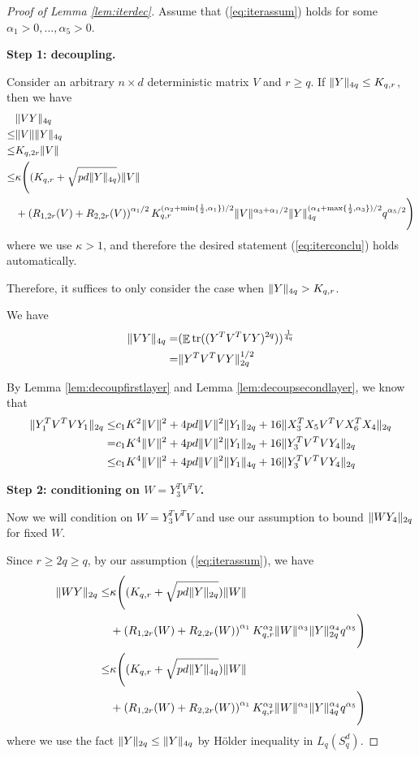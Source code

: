 \documentclass[10pt,a4paper]{amsart}
\DeclareMathOperator*{\tr}{tr}
\DeclareMathOperator{\E}{\mathbb{E}}
\DeclarePairedDelimiter{\norm}{\lVert}{\rVert}
\begin{document}
\begin{proof}[Proof of Lemma \ref{lem:iterdec}]


Assume that (\ref{eq:iterassum}) holds for some $\alpha_1>0,...,\alpha_5>0$.

\textbf{Step 1: decoupling.}


Consider an arbitrary $n \times d$ deterministic matrix $V$ and $r \ge q$. If $\norm{Y}_{4q} \le K_{q,r}$, then we have
\begin{align*}
    &\norm{VY}_{4q} \\\le& 
    \norm{V}\norm{Y}_{4q}
    \\ \le & K_{q,2r}\norm{V}
    \\ \le &\kappa \Bigg((K_{q,r}+\sqrt{pd\norm{Y}_{4q}})\norm{V} \\&+ \left(R_{1,2r}(V)+R_{2,2r}(V)\right)^{\alpha_1/2}K_{q,r}^{(\alpha_2+\min\{\frac{1}{2},\alpha_1\})/2}\norm{V}^{\alpha_3+\alpha_1/2} \norm{Y}_{4q}^{(\alpha_4+\max\{\frac{1}{2},\alpha_3\})/2}q^{\alpha_5/2}\Bigg)
\end{align*}
where we use $\kappa>1$, and therefore the desired statement (\ref{eq:iterconclu}) holds automatically.

Therefore, it suffices to only consider the case when $\norm{Y}_{4q} > K_{q,r}$.


We have
\begin{align*}
    \norm{VY}_{4q}=&(\E\tr((Y^TV^TVY)^{2q}))^{\frac{1}{4q}}
\\=&\norm{Y^TV^TVY}_{2q}^{1/2}
\end{align*}

By Lemma \ref{lem:decoupfirstlayer} and Lemma \ref{lem:decoupsecondlayer}, we know that
\begin{align*}
    \norm{Y_1^TV^TVY_1}_{2q} \le& c_1 K^2 \norm{V}^2 + 4pd\norm{V}^2 \norm{Y_1}_{2q} + 16 \norm{X_3^TX_5V^TVX_6^TX_4}_{2q}
    \\=& c_1 K^4 \norm{V}^2 + 4pd\norm{V}^2 \norm{Y_1}_{2q}+ 16 \norm{Y_3^TV^TVY_4}_{2q}
    \\ \le & c_1 K^4 \norm{V}^2 + 4pd\norm{V}^2 \norm{Y_1}_{4q}+ 16 \norm{Y_3^TV^TVY_4}_{2q}
\end{align*}



\textbf{Step 2: conditioning on $W=Y_3^TV^TV$.}

Now we will condition on $W=Y_3^TV^TV$ and use our assumption to bound $\norm{WY_4}_{2q}$ for fixed $W$.

Since $r \ge 2q \ge q$, by our assumption (\ref{eq:iterassum}), we have
    \begin{align*}
    \norm{WY}_{2q} \le & \kappa \Bigg((K_{q,r}+\sqrt{pd\norm{Y}_{2q}})\norm{W} \\&+ \left(R_{1,2r}(W)+R_{2,2r}(W)\right)^{\alpha_1}K_{q,r}^{\alpha_2}\norm{W}^{\alpha_3} \norm{Y}_{2q} ^{\alpha_4}q^{\alpha_5}\Bigg)
    \\\le & \kappa \Bigg((K_{q,r}+\sqrt{pd\norm{Y}_{4q}})\norm{W} \\&+ \left(R_{1,2r}(W)+R_{2,2r}(W)\right)^{\alpha_1}K_{q,r}^{\alpha_2}\norm{W}^{\alpha_3} \norm{Y}_{4q} ^{\alpha_4}q^{\alpha_5}\Bigg)
\end{align*}
where we use the fact $\norm{Y}_{2q} \le \norm{Y}_{4q}$ by H\"older inequality in $L_q(S_q^d)$.


\end{proof}
\end{document}
